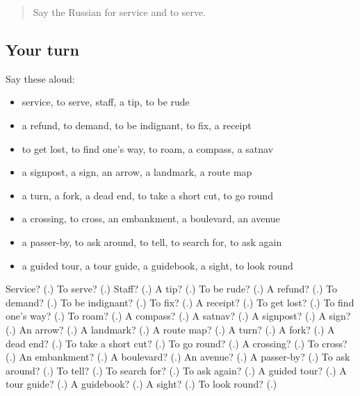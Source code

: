 \begin{quote}
Say the Russian for service and to serve.
\end{quote}

\subsection*{Your turn}
Say these aloud:

\begin{itemize}
\raggedright
  \item service, to serve, staff, a tip, to be rude
  \item a refund, to demand, to be indignant, to fix, a receipt
  \item to get lost, to find one's way, to roam, a compass, a satnav
  \item a signpost, a sign, an arrow, a landmark, a route map
  \item a turn, a fork, a dead end, to take a short cut, to go round
  \item a crossing, to cross, an embankment, a boulevard, an avenue
  \item a passer-by, to ask around, to tell, to search for, to ask again
  \item a guided tour, a tour guide, a guidebook, a sight, to look round
\end{itemize}

\begin{tcolorbox}[breakable,colback=teal!4,colframe=teal!35!black,title={Before you move on}]
Service? (\textbf{}.) To serve? (\textbf{}.) Staff? (\textbf{}.) A tip? (\textbf{}.) To be rude? (\textbf{}.) A refund? (\textbf{}.) To demand? (\textbf{}.) To be indignant? (\textbf{}.) To fix? (\textbf{}.) A receipt? (\textbf{}.) To get lost? (\textbf{}.) To find one's way? (\textbf{}.) To roam? (\textbf{}.) A compass? (\textbf{}.) A satnav? (\textbf{}.) A signpost? (\textbf{}.) A sign? (\textbf{}.) An arrow? (\textbf{}.) A landmark? (\textbf{}.) A route map? (\textbf{}.) A turn? (\textbf{}.) A fork? (\textbf{}.) A dead end? (\textbf{}.) To take a short cut? (\textbf{}.) To go round? (\textbf{}.) A crossing? (\textbf{}.) To cross? (\textbf{}.) An embankment? (\textbf{}.) A boulevard? (\textbf{}.) An avenue? (\textbf{}.) A passer-by? (\textbf{}.) To ask around? (\textbf{}.) To tell? (\textbf{}.) To search for? (\textbf{}.) To ask again? (\textbf{}.) A guided tour? (\textbf{}.) A tour guide? (\textbf{}.) A guidebook? (\textbf{}.) A sight? (\textbf{}.) To look round? (\textbf{}.)
\end{tcolorbox}

